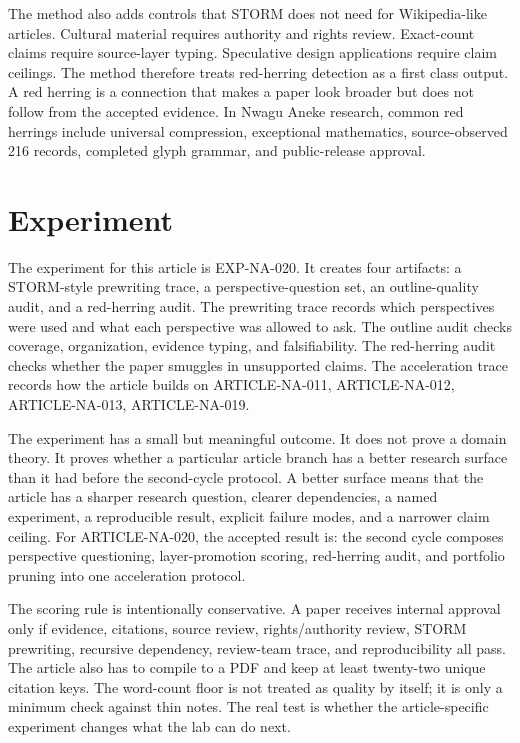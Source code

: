 \documentclass[sigconf,nonacm]{acmart}
\begin{document}
The method also adds controls that STORM does not need for Wikipedia-like
articles. Cultural material requires authority and rights review. Exact-count
claims require source-layer typing. Speculative design applications require
claim ceilings. The method therefore treats red-herring detection as a first
class output. A red herring is a connection that makes a paper look broader but
does not follow from the accepted evidence. In Nwagu Aneke research, common red
herrings include universal compression, exceptional mathematics, source-observed
216 records, completed glyph grammar, and public-release approval.

\section{Experiment}
The experiment for this article is EXP-NA-020. It creates four artifacts: a
STORM-style prewriting trace, a perspective-question set, an outline-quality
audit, and a red-herring audit. The prewriting trace records which perspectives
were used and what each perspective was allowed to ask. The outline audit checks
coverage, organization, evidence typing, and falsifiability. The red-herring
audit checks whether the paper smuggles in unsupported claims. The acceleration
trace records how the article builds on ARTICLE-NA-011, ARTICLE-NA-012, ARTICLE-NA-013, ARTICLE-NA-019.

The experiment has a small but meaningful outcome. It does not prove a domain
theory. It proves whether a particular article branch has a better research
surface than it had before the second-cycle protocol. A better surface means
that the article has a sharper research question, clearer dependencies, a named
experiment, a reproducible result, explicit failure modes, and a narrower claim
ceiling. For ARTICLE-NA-020, the accepted result is: the second cycle composes perspective questioning, layer-promotion scoring, red-herring audit, and portfolio pruning into one acceleration protocol.

The scoring rule is intentionally conservative. A paper receives internal
approval only if evidence, citations, source review, rights/authority review,
STORM prewriting, recursive dependency, review-team trace, and reproducibility
all pass. The article also has to compile to a PDF and keep at least twenty-two
unique citation keys. The word-count floor is not treated as quality by itself;
it is only a minimum check against thin notes. The real test is whether the
article-specific experiment changes what the lab can do next.
\end{document}
